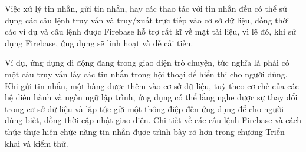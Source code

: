 Việc xử lý tin nhắn, gửi tin nhắn, hay các thao tác với tin nhắn đều có thể sử dụng các câu lệnh truy vấn và truy/xuất
trực tiếp vào cơ sở dữ liệu, đồng thời các ví dụ và câu lệnh được Firebase hỗ trợ rất kĩ về mặt tài liệu, vì lẽ đó, khi sử dụng
Firebase, ứng dụng sẽ linh hoạt và dễ cải tiến.

Ví dụ, ứng dụng di động đang trong giao diện trò chuyện, tức nghĩa là phải có một câu truy vấn lấy các tin nhắn trong hội thoại
để hiển thị cho người dùng. Khi gửi tin nhắn, một hàng được thêm vào
cơ sở dữ liệu, tuỳ theo cơ chế của các hệ điều hành và ngôn ngữ lập trình, ứng dụng có thể lắng nghe được sự thay đổi
trong cơ sở dữ liệu và lập tức gửi một thông điệp đến ứng dụng để cho người dùng biết, đồng thời cập nhật giao diện. Chi tiết
về các câu lệnh Firebase và cách thức thực hiện chức năng tin nhắn được trình bày rõ hơn trong chương Triển khai và kiểm thử.




\newpage